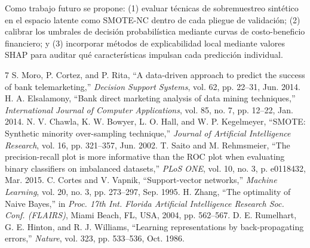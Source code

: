 \documentclass[conference]{IEEEtran}
\begin{document}
Como trabajo futuro se propone: (1) evaluar técnicas de sobremuestreo sintético en el espacio latente como SMOTE-NC dentro de cada pliegue de validación; (2) calibrar los umbrales de decisión probabilística mediante curvas de costo-beneficio financiero; y (3) incorporar métodos de explicabilidad local mediante valores SHAP para auditar qué características impulsan cada predicción individual.

\begin{thebibliography}{7}
 S. Moro, P. Cortez, and P. Rita, ``A data-driven approach to predict the success of bank telemarketing,'' \textit{Decision Support Systems}, vol. 62, pp. 22--31, Jun. 2014.
 H. A. Elsalamony, ``Bank direct marketing analysis of data mining techniques,'' \textit{International Journal of Computer Applications}, vol. 85, no. 7, pp. 12--22, Jan. 2014.
 N. V. Chawla, K. W. Bowyer, L. O. Hall, and W. P. Kegelmeyer, ``SMOTE: Synthetic minority over-sampling technique,'' \textit{Journal of Artificial Intelligence Research}, vol. 16, pp. 321--357, Jun. 2002.
 T. Saito and M. Rehmsmeier, ``The precision-recall plot is more informative than the ROC plot when evaluating binary classifiers on imbalanced datasets,'' \textit{PLoS ONE}, vol. 10, no. 3, p. e0118432, Mar. 2015.
 C. Cortes and V. Vapnik, ``Support-vector networks,'' \textit{Machine Learning}, vol. 20, no. 3, pp. 273--297, Sep. 1995.
 H. Zhang, ``The optimality of Naive Bayes,'' in \textit{Proc. 17th Int. Florida Artificial Intelligence Research Soc. Conf. (FLAIRS)}, Miami Beach, FL, USA, 2004, pp. 562--567.
 D. E. Rumelhart, G. E. Hinton, and R. J. Williams, ``Learning representations by back-propagating errors,'' \textit{Nature}, vol. 323, pp. 533--536, Oct. 1986.
\end{thebibliography}
\end{document}
